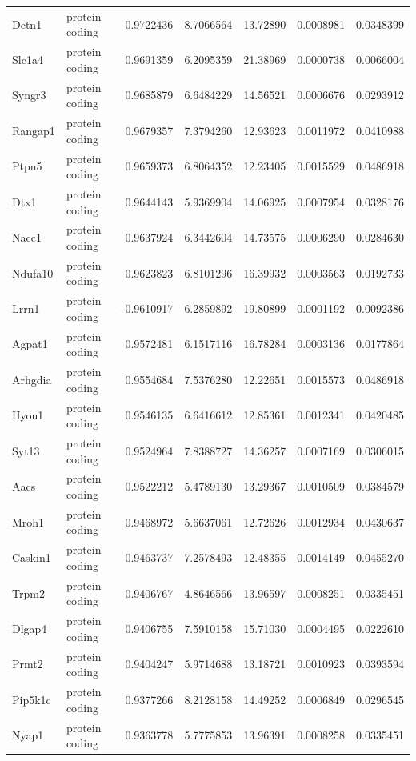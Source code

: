 \documentclass[onehalf,12pt]{beavtex}
\begin{document}
\begin{longtable}{llrrrrr}
  Dctn1 & protein coding & 0.9722436 & 8.7066564 & 13.72890 & 0.0008981 & 0.0348399\\
  Slc1a4 & protein coding & 0.9691359 & 6.2095359 & 21.38969 & 0.0000738 & 0.0066004\\
  Syngr3 & protein coding & 0.9685879 & 6.6484229 & 14.56521 & 0.0006676 & 0.0293912\\
  Rangap1 & protein coding & 0.9679357 & 7.3794260 & 12.93623 & 0.0011972 & 0.0410988\\
  Ptpn5 & protein coding & 0.9659373 & 6.8064352 & 12.23405 & 0.0015529 & 0.0486918\\
  \addlinespace
  Dtx1 & protein coding & 0.9644143 & 5.9369904 & 14.06925 & 0.0007954 & 0.0328176\\
  Nacc1 & protein coding & 0.9637924 & 6.3442604 & 14.73575 & 0.0006290 & 0.0284630\\
  Ndufa10 & protein coding & 0.9623823 & 6.8101296 & 16.39932 & 0.0003563 & 0.0192733\\
  Lrrn1 & protein coding & -0.9610917 & 6.2859892 & 19.80899 & 0.0001192 & 0.0092386\\
  Agpat1 & protein coding & 0.9572481 & 6.1517116 & 16.78284 & 0.0003136 & 0.0177864\\
  \addlinespace
  Arhgdia & protein coding & 0.9554684 & 7.5376280 & 12.22651 & 0.0015573 & 0.0486918\\
  Hyou1 & protein coding & 0.9546135 & 6.6416612 & 12.85361 & 0.0012341 & 0.0420485\\
  Syt13 & protein coding & 0.9524964 & 7.8388727 & 14.36257 & 0.0007169 & 0.0306015\\
  Aacs & protein coding & 0.9522212 & 5.4789130 & 13.29367 & 0.0010509 & 0.0384579\\
  Mroh1 & protein coding & 0.9468972 & 5.6637061 & 12.72626 & 0.0012934 & 0.0430637\\
  \addlinespace
  Caskin1 & protein coding & 0.9463737 & 7.2578493 & 12.48355 & 0.0014149 & 0.0455270\\
  Trpm2 & protein coding & 0.9406767 & 4.8646566 & 13.96597 & 0.0008251 & 0.0335451\\
  Dlgap4 & protein coding & 0.9406755 & 7.5910158 & 15.71030 & 0.0004495 & 0.0222610\\
  Prmt2 & protein coding & 0.9404247 & 5.9714688 & 13.18721 & 0.0010923 & 0.0393594\\
  Pip5k1c & protein coding & 0.9377266 & 8.2128158 & 14.49252 & 0.0006849 & 0.0296545\\
  \addlinespace
  Nyap1 & protein coding & 0.9363778 & 5.7775853 & 13.96391 & 0.0008258 & 0.0335451\\

\end{longtable}
\end{document}
